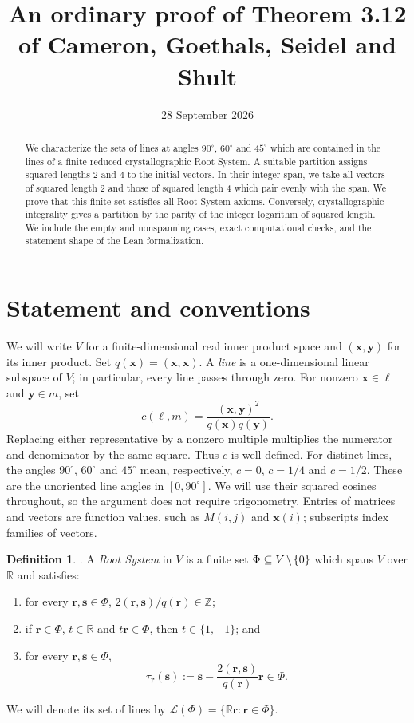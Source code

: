 \documentclass[11pt]{amsart}
\title[An ordinary proof of Theorem 3.12]{An ordinary proof of Theorem 3.12 of Cameron, Goethals, Seidel and Shult}
\date{28 September 2026}
\newcommand\cL{{\mathcal L}}
\newcommand\ints{{\mathbb Z}}
\newcommand\re{{\mathbb R}}%
\newcommand\Zy{{\mathbf y}}
\newcommand\Zx{{\mathbf x}}
\newcommand\diff{\mathbin{\mkern-1.5mu\setminus\mkern-1.5mu}}%
\newcommand\sbs{\subseteq}
\theoremstyle{definition}
\newtheorem{definition}[theorem]{Definition}
\newcommand{\Zr}{{\mathbf r}}
\newcommand{\Zs}{{\mathbf s}}
\begin{document}
\raggedbottom
\begin{abstract}
We characterize the sets of lines at angles $90^\circ$, $60^\circ$ and
$45^\circ$ which are contained in the lines of a finite reduced
crystallographic Root System. A suitable partition assigns squared lengths
2 and 4 to the initial vectors. In their integer span, we take all vectors
of squared length 2 and those of squared length 4 which pair evenly with
the span. We prove that this finite set satisfies all Root System axioms.
Conversely, crystallographic integrality gives a partition by the parity
of the integer logarithm of squared length. We include the empty
and nonspanning cases, exact computational checks, and the statement shape
of the Lean formalization.
\end{abstract}
\maketitle

\section{Statement and conventions}\label{sec:statement}

We will write $V$ for a finite-dimensional real inner product space and
$(\Zx,\Zy)$ for its inner product. Set $q(\Zx)=(\Zx,\Zx)$.
A \emph{line} is a one-dimensional linear subspace of $V$; in particular,
every line passes through zero. For nonzero $\Zx\in\ell$ and
$\Zy\in m$, set
\begin{equation}\label{eq:cosine}
 c(\ell,m)=\frac{(\Zx,\Zy)^2}{q(\Zx)q(\Zy)}.
\end{equation}
Replacing either representative by a nonzero multiple multiplies the
numerator and denominator by the same square. Thus $c$ is well-defined.
For distinct lines, the angles $90^\circ$, $60^\circ$ and $45^\circ$
mean, respectively, $c=0$, $c=1/4$ and $c=1/2$.
These are the unoriented line angles in $[0,90^\circ]$. We will use their squared
cosines throughout, so the argument does not require trigonometry.
Entries of matrices and vectors are function values, such as $M(i,j)$
and $\Zx(i)$; subscripts index families of vectors.

\begin{definition}\label{def:rootset}
\textup{\cite[Definition 3.9, with the corrections below]{CGSS}.}
A \emph{Root System} in $V$ is a finite set
$\Phi\sbs V\diff\{0\}$ which spans $V$ over $\re$ and satisfies:
\begin{enumerate}
\item for every $\Zr,\Zs\in\Phi$,
      $2(\Zr,\Zs)/q(\Zr)\in\ints$;
\item if $\Zr\in\Phi$, $t\in\re$ and $t\Zr\in\Phi$, then
      $t\in\{1,-1\}$; and
\item for every $\Zr,\Zs\in\Phi$,
\[
 \tau_{\Zr}(\Zs):=\Zs-\frac{2(\Zr,\Zs)}{q(\Zr)}\Zr\in\Phi.
\]
\end{enumerate}
We will denote its set of lines by
$\cL(\Phi)=\{\re\Zr:\Zr\in\Phi\}$.
\end{definition}
\end{document}
